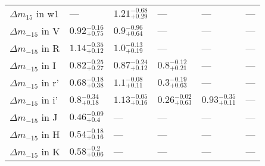 \begin{tabular}{llllll}
${\Delta m}_{15}$ in w1  &                     --- &  $1.21^{-0.68}_{+0.29}$ &                     --- &                     --- &                     --- \\
${\Delta m}_{-15}$ in V  &  $0.92^{-0.16}_{+0.75}$ &   $0.9^{-0.96}_{+0.64}$ &                     --- &                     --- &                     --- \\
${\Delta m}_{-15}$ in R  &  $1.14^{-0.35}_{+0.12}$ &   $1.0^{-0.13}_{+0.19}$ &                     --- &                     --- &                     --- \\
${\Delta m}_{-15}$ in I  &  $0.82^{-0.25}_{+0.27}$ &  $0.87^{-0.24}_{+0.12}$ &   $0.8^{-0.12}_{+0.21}$ &                     --- &                     --- \\
${\Delta m}_{-15}$ in r' &  $0.68^{-0.18}_{+0.38}$ &   $1.1^{-0.08}_{+0.11}$ &   $0.3^{-0.19}_{+0.63}$ &                     --- &                     --- \\
${\Delta m}_{-15}$ in i' &   $0.8^{-0.34}_{+0.18}$ &  $1.13^{-0.05}_{+0.16}$ &  $0.26^{-0.02}_{+0.63}$ &  $0.93^{-0.35}_{+0.11}$ &                     --- \\
${\Delta m}_{-15}$ in J  &   $0.46^{-0.09}_{+0.4}$ &                     --- &                     --- &                     --- &                     --- \\
${\Delta m}_{-15}$ in H  &  $0.54^{-0.18}_{+0.16}$ &                     --- &                     --- &                     --- &                     --- \\
${\Delta m}_{-15}$ in K  &   $0.58^{-0.2}_{+0.06}$ &                     --- &                     --- &                     --- &                     --- \\
\bottomrule
\end{tabular}
